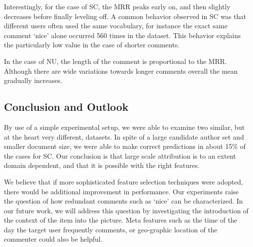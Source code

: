 Interestingly, for the case of SC, the MRR peaks early on, and then slightly decreases before finally leveling off. A common behavior observed in SC was that different users often used the same vocabulary, for instance the exact same comment `nice' alone occurred 560 times in the dataset. This behavior explains the particularly low value in the case of shorter comments. 

In the case of NU, the length of the comment is proportional to the MRR. Although there are wide variations towards longer comments overall the mean gradually increases.

\subsection{Conclusion and Outlook}
By use of a simple experimental setup, we were able to examine two similar, but at the heart very different, datasets. In spite of a large candidate author set and smaller document size, we were able to make correct predictions in about 15\% of the cases for SC. Our conclusion is that large scale attribution is to an extent domain dependent, and that it is possible with the right features.

We believe that if more sophisticated feature selection techniques were adopted, there would be additional improvement in performance. 
Our experiments raise the question of how redundant comments such as `nice' can be characterized. 
In our future work, we will address this question by investigating the introduction of the context of the item into the picture. 
Meta features such as the time of the day the target user frequently comments, or geo-graphic location of the commenter could also be helpful.

